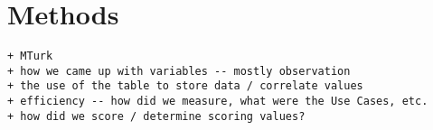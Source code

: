 \section{Methods}
\label{sec:methods}



\begin{verbatim}
+ MTurk
+ how we came up with variables -- mostly observation
+ the use of the table to store data / correlate values
+ efficiency -- how did we measure, what were the Use Cases, etc.
+ how did we score / determine scoring values?
\end{verbatim}
